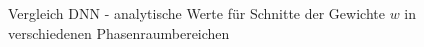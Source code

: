 \begin{figure}[htb]
	\centering
	\caption{Vergleich DNN - analytische Werte für Schnitte der Gewichte $w$ in verschiedenen Phasenraumbereichen}
	\label{reweight-schnitte}
\end{figure}
